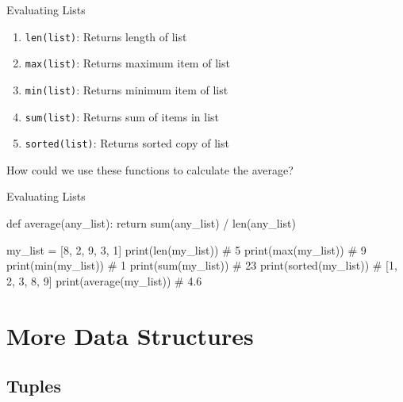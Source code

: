 \begin{frame}{Evaluating Lists}

    \begin{enumerate}
		\item \texttt{len(list)}: Returns length of list
		\item \texttt{max(list)}: Returns maximum item of list
		\item \texttt{min(list)}: Returns minimum item of list
		\item \texttt{sum(list)}: Returns sum of items in list
		\item \texttt{sorted(list)}: Returns sorted copy of list
    \end{enumerate}

	\vspace{1em}
	How could we use these functions to calculate the average?


\end{frame}

\begin{frame}[fragile]{Evaluating Lists}

    \begin{pythoncode}

def average(any_list):
	return sum(any_list) / len(any_list)
    
my_list = [8, 2, 9, 3, 1]
print(len(my_list)) # 5
print(max(my_list)) # 9
print(min(my_list)) # 1
print(sum(my_list)) # 23 
print(sorted(my_list)) # [1, 2, 3, 8, 9]
print(average(my_list)) # 4.6

	\end{pythoncode}

\end{frame}

\section{More Data Structures}

\subsection{Tuples}

